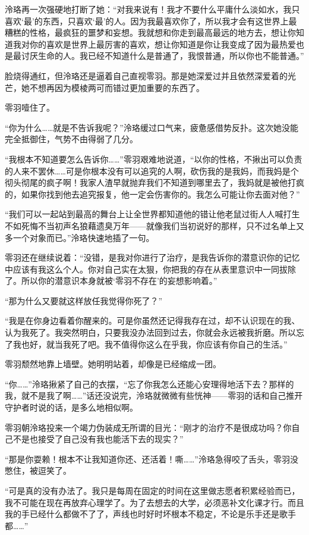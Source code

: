 \documentclass[UTF8, scheme = chinese, openany]{ctexbook}
\begin{document}
泠珞再一次强硬地打断了她：“对我来说有！我才不要什么平庸什么淡如水，我只喜欢‘最’的东西，只喜欢‘最’的人。因为我最喜欢你了，所以我才会有这世界上最糟糕的性格，最疯狂的噩梦和妄想。我就想和你走到最高最远的地方去，想让你知道我对你的喜欢是世界上最厉害的喜欢，想让你知道是你让我变成了因为最热爱也是最讨厌生命的人。我已经不知道什么是普通了，我恨普通，所以你也不能普通。”

脸烧得通红，但泠珞还是逼着自己直视零羽。那是她深爱过并且依然深爱着的光芒，她不想再因为模棱两可而错过更加重要的东西了。

零羽噎住了。

“你为什么……就是不告诉我呢？”泠珞缓过口气来，疲惫感借势反扑。这次她没能完全抵御住，气势不由得弱了几分。

“我根本不知道要怎么告诉你……”零羽艰难地说道，“以你的性格，不揪出可以负责的人来不罢休……可是你根本没有可以追究的人啊，砍伤我的是我妈，而我妈是个彻头彻尾的疯子啊！我家人渣早就抛弃我们不知道到哪里去了，我妈就是被他打疯的，如果你找到他去追究报复，他一定会伤害你的。我怎么可能让你去面对他？”

“我们可以一起站到最高的舞台上让全世界都知道他的错让他老鼠过街人人喊打生不如死悔不当初声名狼藉遗臭万年——就像我们当初说好的那样，只不过名单上又多一个对象而已。”泠珞快速地插了一句。

零羽还在继续说着：“没错，是我对你进行了治疗，是我告诉你的潜意识你的记忆中应该有我这么个人。你对自己实在太狠，你把我的存在从表里意识中一同拔除了。所以你的潜意识本身就被‘零羽不存在’的妄想影响着。”

“那为什么又要就这样放任我觉得你死了？”

“我是在你身边看着你醒来的。可是你虽然还记得我存在过，却不认识现在的我、认为我死了。我突然明白，只要我没办法回到过去，你就会永远被我折磨。所以忘了我也好，就当我死了吧。我不值得你这么在乎我，你应该有你自己的生活。”

零羽颓然地靠上墙壁。她明明站着，却像是已经缩成一团。

“你……”泠珞揪紧了自己的衣摆，“忘了你我怎么还能心安理得地活下去？那样的我，就不是我了啊……”话还没说完，泠珞就微微有些恍神——零羽的话和自己推开守护者时说的话，是多么地相似啊。

零羽朝泠珞投来一个竭力伪装成无所谓的目光：“刚才的治疗不是很成功吗？你自己不是也接受了自己没有我也能活下去的现实？”

“那是你耍赖！根本不让我知道你还、还活着！嘶……”泠珞急得咬了舌头，零羽没憋住，被逗笑了。

“可是真的没有办法了。我只是每周在固定的时间在这里做志愿者积累经验而已，我不可能在现在再放弃心理学了。为了去想去的大学，必须恶补文化课才行。而且我的手已经什么都做不了了，声线也时好时坏根本不稳定，不论是乐手还是歌手都……”
\end{document}
